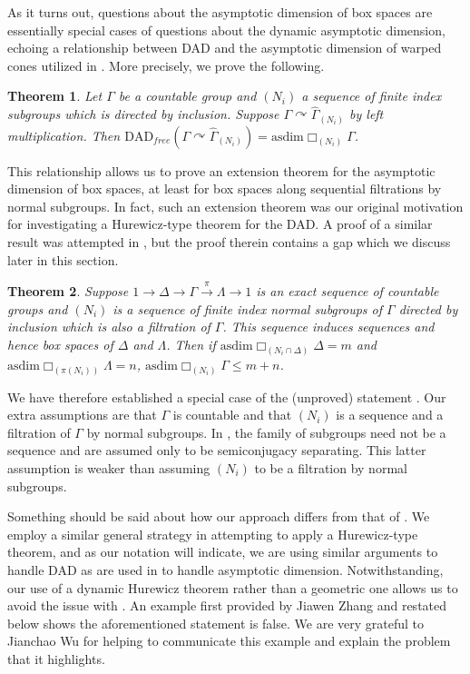 \documentclass[12pt]{article}
\newcommand{\acts}{\curvearrowright}
\newcommand{\asdim}{\text{asdim}}
\newcommand{\dad}{\text{DAD}}
\newtheorem{thmx}{Theorem} %
\begin{document}
As it turns out, questions about the asymptotic dimension of box spaces are essentially special cases of questions about the dynamic asymptotic dimension, echoing a relationship between DAD and the asymptotic dimension of warped cones utilized in \cite[Section 8]{warpedcones}.  More precisely, we prove the following.  

\begin{thmx} \label{Theorem D}
Let $\Gamma$ be a countable group and $(N_i)$ a sequence of finite index subgroups which is directed by inclusion.  Suppose $\Gamma\acts \widehat{\Gamma}_{(N_i)}$ by left multiplication.  Then $\dad_{free}(\Gamma\acts \widehat{\Gamma}_{(N_i)}) = \asdim\Box_{(N_i)}\Gamma$.  
\end{thmx}

This relationship allows us to prove an extension theorem for the asymptotic dimension of box spaces, at least for box spaces along sequential filtrations by normal subgroups.  In fact, such an extension theorem was our original motivation for investigating a Hurewicz-type theorem for the DAD.  A proof of a similar result was attempted in \cite{finnsell2015asymptotic}, but the proof therein contains a gap which we discuss later in this section.  

\begin{thmx}
Suppose $1\to \Delta\to \Gamma\xrightarrow{\pi} \Lambda\to 1$ is an exact sequence of countable groups and $(N_i)$ is a sequence of finite index normal subgroups of $\Gamma$ directed by inclusion which is also a filtration of $\Gamma$.  This sequence induces sequences and hence box spaces of $\Delta$ and $\Lambda$.   Then if $\asdim\Box_{(N_i\cap \Delta)}\Delta = m$ and $\asdim\Box_{(\pi(N_i))}\Lambda = n$, $\asdim\Box_{(N_i)}\Gamma \leq m + n$.  
\end{thmx} 

We have therefore established a special case of the (unproved) statement \cite[Theorem A]{finnsell2015asymptotic}.  Our extra assumptions are that $\Gamma$ is countable and that $(N_i)$ is a sequence and a filtration of $\Gamma$ by normal subgroups.  In \cite[Theorem A]{finnsell2015asymptotic}, the family of subgroups need not be a sequence and are assumed only to be semiconjugacy separating.  This latter assumption is weaker than assuming $(N_i)$ to be a filtration by normal subgroups.  

Something should be said about how our approach differs from that of \cite{finnsell2015asymptotic}.  We employ a similar general strategy in attempting to apply a Hurewicz-type theorem, and as our notation will indicate, we are using similar arguments to handle DAD as are used in \cite{Brodskiy2006AHT} to handle asymptotic dimension.  Notwithstanding, our use of a dynamic Hurewicz theorem rather than a geometric one allows us to avoid the issue with \cite[Lemma 4.1(5)]{finnsell2015asymptotic}.  An example first provided by Jiawen Zhang and restated below shows the aforementioned statement is false.  We are very grateful to Jianchao Wu for helping to communicate this example and explain the problem that it highlights.  
\end{document}
